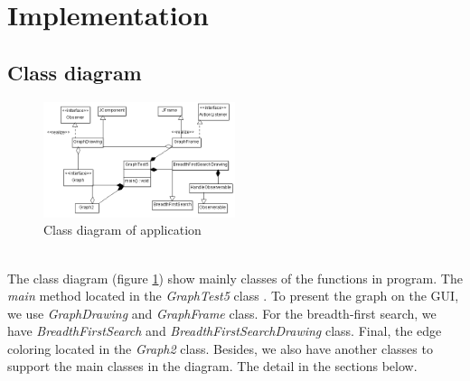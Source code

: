\section{Implementation}
\subsection{Class diagram}
\begin{figure}[h!]
\centering
\includegraphics[width=0.5\textwidth]{./images/class_diagram}
\caption{Class diagram of application}
\label{fig:classdiagram}
\end{figure}~\\
The class diagram (figure \ref{fig:classdiagram}) show mainly classes of the functions in program. The \textit{main} method located in the \textit{GraphTest5} class . To present the graph on the GUI, we use \textit{GraphDrawing} and \textit{GraphFrame} class. For the breadth-first search, we have \textit{BreadthFirstSearch} and \textit{BreadthFirstSearchDrawing} class. Final, the edge coloring located in the \textit{Graph2} class. Besides, we also have another classes to support the main classes in the diagram. The detail in the sections below.
